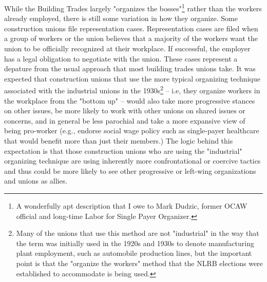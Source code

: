 \documentclass[12pt]{article}
\begin{document}
While the Building Trades largely "organizes the bosses"\footnote{A wonderfully apt description that I owe to Mark Dudzic, former OCAW official and long-time Labor for Single Payer Organizer.} rather than the workers already employed, there is still some variation in how they organize. Some construction unions file representation cases. Representation cases are filed when a group of workers or the union believes that a majority of the workers want the union to be officially recognized at their workplace. If successful, the employer has a legal obligation to negotiate with the union. These cases represent a depature from the usual approach that most building trades unions take. It was expected that construction unions that use the more typical organizing technique associated with the industrial unions in the 1930s\footnote{Many of the unions that use this method are not "industrial" in the way that the term was initially used in the 1920s and 1930s to denote manufacturing plant employment, such as automobile production lines, but the important point is that the "organize the workers" method that the NLRB elections were established to accommodate is being used.} -- i.e, they organize workers in the workplace from the "bottom up" -- would also take more progressive stances on other issues, be more likely to work with other unions on shared issues or concerns, and in general be less parochial and take a more expansive view of being pro-worker (e.g., endorse social wage policy such as single-payer healthcare that would benefit more than just their members.) The logic behind this expectation is that those construction unions who are using the "industrial" organizing technique are using inherently more confrontational or coercive tactics and thus could be more likely to see other progressive or left-wing organizations and unions as allies.
\end{document}
